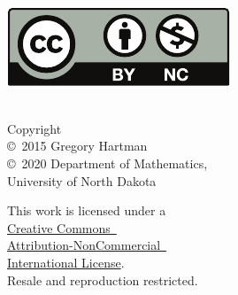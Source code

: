 \noindent\hspace{-1in}
\begin{minipage}[t]{.4\linewidth}\mbox{}\\
\href{http://creativecommons.org/licenses/by-nc/4.0/}{\includegraphics{figures/raw/by-nc}}
\end{minipage}\quad
\begin{minipage}[t]{.5\linewidth}\raggedright\mbox{}\\
\noindent Copyright\\
\copyright~2015 Gregory Hartman\\
\copyright~2020 Department of Mathematics,\\
University of North Dakota\medskip

\noindent
This work is licensed under a\iflatexml\ \else\\\fi \href{http://creativecommons.org/licenses/by-nc/4.0/}{Creative Commons\iflatexml\ \else\\\fi
Attribution-NonCommercial\iflatexml\ \else\\ International License}.\\
Resale and reproduction restricted.
\end{minipage}


